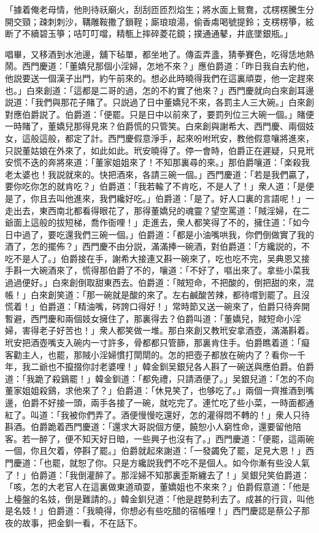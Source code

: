 \begin{myquote}
「據着俺老母情，他則待祅廟火，刮刮匝匝烈焰生；將水面上鴛鴦，忒楞楞騰生分開交頸；疎刺刺沙，鞲雕鞍撒了鎖鞓；廝琅琅湯，偷香䖏喝號提鈴；支楞楞箏，絃断了不續碧玉箏；咭叮叮噹，精甎上摔碎菱花鏡；撲通通鼕，井底墜銀瓶。」
\end{myquote}

唱畢，又移酒到水池邊，舖下毡單，都坐地了。傳盃弄盞，猜拳賽色，吃得恁地熱鬧。西門慶道：「董嬌兒那個小淫婦，怎地不來？」應伯爵道：「昨日我自去約他，他説要送一個漢子出門，約午前來的。想必此時曉得我們在這裏頑耍，他一定趕來也。」白來創道：「這都是二哥的過，怎的不約實了他來？」西門慶就向白來創耳邊説道：「我們與那花子賭了。只説過了日中董嬌兒不來，各罰主人三大碗。」白來創對應伯爵説了。伯爵道：「便罷。只是日中以前來了，要罰列位三大碗一個。」賭便一時賭了，董嬌兒那得見來？伯爵慌的只管笑。白來創與謝希大、西門慶、兩個妓女，這般這般，都定了計。西門慶假意淨手，起來吩咐玳安，教他假意嚷將進來，只説董姑娘在外來了，如此如此。玳安曉得了。停一會時，伯爵正在遲疑，只見玳安慌不迭的奔將來道：「董家姐姐來了！不知那裏尋的來。」那伯爵嚷道：「楽殺我老太婆也！我説就來的。快把酒來，各請三碗一個。」西門慶道：「若是我們贏了，要你吃你怎的就肯吃？」伯爵道：「我若輸了不肯吃，不是人了！」衆人道：「是便是了，你且去叫他進來，我們纔好吃。」伯爵道：「是了。好人口裏的言語呢！」一走出去，東西南北都看得眼花了，那得董嬌兒的魂靈？望空罵道：「賊淫婦，在二爺面上這般的拔短梯，喬作衙哩！」走進去，衆人都笑得了不的，擁住道：「如今日中過了，要吃還我們三碗一個。」伯爵道：「都是小油嘴哄我，你們倒做實了我的酒了，怎的擺佈？」西門慶不由分説，滿滿捧一碗酒，對伯爵道：「方纔説的，不吃不是人了。」伯爵接在手，謝希大接連又斟一碗來了，吃也吃不完，吴典恩又接手斟一大碗酒來了，慌得那伯爵了不的，嚷道：「不好了，嘔出來了。拿些小菜我過過便好。」白來創倒取甜東西去。伯爵道：「賊短命，不把酸的，倒把甜的來，混帳！」白來創笑道：「那一碗就是酸的來了。左右鹹酸苦辣，都待嚐到罷了。且沒慌着！」伯爵道：「精油嘴，硶誇口得好！」常時節又送一碗來了，伯爵只待奔開暫避，西門慶和兩個妓女擁住了，那裏得去？伯爵叫道：「董嬌兒，賊短命小淫婦，害得老子好苦也！」衆人都笑做一堆。那白來創又教玳安拿酒壺，滿滿斟着。玳安把酒壺嘴支入碗内一寸許多，骨都都只管篩，那裏肯住手。伯爵瞧着道：「癡客勸主人，也罷，那賊小淫婦慣打閛閛的。怎的把壺子都放在碗内了？看你一千年，我二爺也不攛掇你討老婆哩！」韓金釧吴銀兒各人斟了一碗送與應伯爵。伯爵道：「我跪了殺鷄罷！」韓金釧道：「都免禮，只請酒便了。」吴銀兒道：「怎的不向董家姐姐殺鷄，求他來了？」伯爵道：「休見笑了，也够吃了。」兩個一齊推酒到嘴邊，伯爵不好接一頭，兩手各接了一碗，就吃完了。連忙吃了些小菜，一時面都通紅了。叫道：「我被你們弄了。酒便慢慢吃還好，怎的灌得悶不轉的！」衆人只待斟酒。伯爵跪着西門慶道：「還求大哥説個方便，饒恕小人窮性命，還要留他陪客。若一醉了，便不知天好日暗，一些興子也沒有了。」西門慶道：「便罷，這兩碗一個，你且欠着，停斟了罷。」伯爵就起來謝道：「一發蠲免了罷，足見大恩！」西門慶道：「也罷，就恕了你。只是方纔説我們不吃不是個人。如今你漸有些没人氣了！」伯爵道：「我倒灌醉了。那淫婦不知那裏歪斯纏去了！」吴銀兒笑伯爵道：「咳，怎的大老官人在這裏做東道頑耍，董嬌姐也不來來？」伯爵假意道：「他是上檯盤的名妓，倒是難請的。」韓金釧兒道：「他是趕勢利去了。成甚的行貨，叫他是名妓！」伯爵道：「我曉得，你想必有些吃醋的宿帳哩！」西門慶認是蔡公子那夜的故事，把金釧一看，不在話下。

